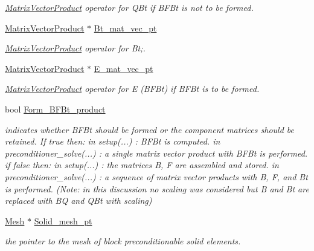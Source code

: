 \begin{DoxyCompactItemize}
\begin{DoxyCompactList}\small\item\em \hyperlink{classoomph_1_1MatrixVectorProduct}{Matrix\+Vector\+Product} operator for Q\+Bt if B\+F\+Bt is not to be formed. \end{DoxyCompactList}\item 
\hyperlink{classoomph_1_1MatrixVectorProduct}{Matrix\+Vector\+Product} $\ast$ \hyperlink{classoomph_1_1PressureBasedSolidLSCPreconditioner_ac71c3f992d9790ca2e25e9c360eed635}{Bt\+\_\+mat\+\_\+vec\+\_\+pt}
\begin{DoxyCompactList}\small\item\em \hyperlink{classoomph_1_1MatrixVectorProduct}{Matrix\+Vector\+Product} operator for Bt;. \end{DoxyCompactList}\item 
\hyperlink{classoomph_1_1MatrixVectorProduct}{Matrix\+Vector\+Product} $\ast$ \hyperlink{classoomph_1_1PressureBasedSolidLSCPreconditioner_a5c6f62a80349652aeff75140ec9c54f1}{E\+\_\+mat\+\_\+vec\+\_\+pt}
\begin{DoxyCompactList}\small\item\em \hyperlink{classoomph_1_1MatrixVectorProduct}{Matrix\+Vector\+Product} operator for E (B\+F\+Bt) if B\+F\+Bt is to be formed. \end{DoxyCompactList}\item 
bool \hyperlink{classoomph_1_1PressureBasedSolidLSCPreconditioner_a216ed50190c2fa031c222b309e573f09}{Form\+\_\+\+B\+F\+Bt\+\_\+product}
\begin{DoxyCompactList}\small\item\em indicates whether B\+F\+Bt should be formed or the component matrices should be retained. If true then\+: in setup(...) \+: B\+F\+Bt is computed. in preconditioner\+\_\+solve(...) \+: a single matrix vector product with B\+F\+Bt is performed. if false then\+: in setup(...) \+: the matrices B, F are assembled and stored. in preconditioner\+\_\+solve(...) \+: a sequence of matrix vector products with B, F, and Bt is performed. (Note\+: in this discussion no scaling was considered but B and Bt are replaced with BQ and Q\+Bt with scaling) \end{DoxyCompactList}\item 
\hyperlink{classoomph_1_1Mesh}{Mesh} $\ast$ \hyperlink{classoomph_1_1PressureBasedSolidLSCPreconditioner_aa14db4490d9ce73788e22bc3d465489b}{Solid\+\_\+mesh\+\_\+pt}
\begin{DoxyCompactList}\small\item\em the pointer to the mesh of block preconditionable solid elements. \end{DoxyCompactList}\end{DoxyCompactItemize}
